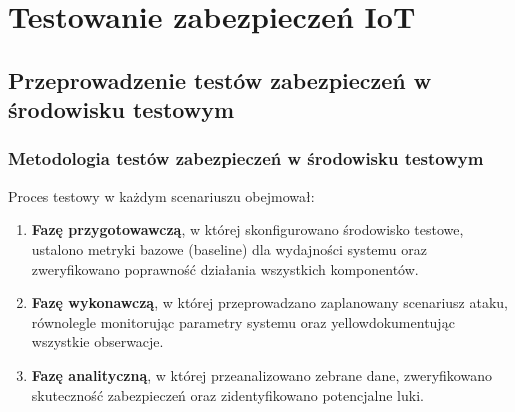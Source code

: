 \chapter{Testowanie zabezpieczeń IoT}
\label{chap:rozdzial5}
\section{Przeprowadzenie testów zabezpieczeń w środowisku testowym}
\subsection{Metodologia testów zabezpieczeń w środowisku testowym}
Proces testowy w każdym scenariuszu obejmował: 
\begin{enumerate}
    \item \textbf{Fazę przygotowawczą}, w której skonfigurowano środowisko testowe, ustalono metryki bazowe (baseline) dla wydajności systemu oraz zweryfikowano poprawność działania wszystkich komponentów.
    \item \textbf{Fazę wykonawczą}, w której przeprowadzano zaplanowany scenariusz ataku, równolegle monitorując parametry systemu oraz yellowdokumentując wszystkie obserwacje.
    \item \textbf{Fazę analityczną}, w której przeanalizowano zebrane dane, zweryfikowano skuteczność zabezpieczeń oraz zidentyfikowano potencjalne luki.
\end{enumerate}

